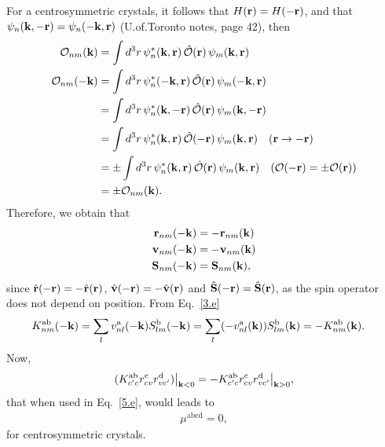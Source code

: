 \documentclass[floatfix,prb,aps,superscriptaddress,11pt]{revtex4}
\begin{document}
For a centrosymmetric crystals, it follows that $H(\mathbf{r})=H(-\mathbf{r})$,
and that $\psi_n(\mathbf{k},-\mathbf{r})=\psi_n(-\mathbf{k},\mathbf{r})$
 (U.of.Toronto notes,
page 42), then 
\begin{align}\label{e.0}
{\cal O}_{nm}(\mathbf{k}) 
&=\int d^3r\, \psi^*_n(\mathbf{k},\mathbf{r})\, \hat{{\cal O}}(\mathbf{r})\,\psi_m(\mathbf{k},\mathbf{r}) 
\nonumber\\
{\cal O}_{nm}(-\mathbf{k}) 
&=\int d^3r\, \psi^*_n(-\mathbf{k},\mathbf{r})\, \hat{{\cal O}}(\mathbf{r})\,\psi_m(-\mathbf{k},\mathbf{r}) 
\nonumber\\
&=\int d^3r\, \psi^*_n(\mathbf{k},-\mathbf{r})\, \hat{{\cal O}}(\mathbf{r})\,\psi_m(\mathbf{k},-\mathbf{r}) 
\nonumber\\
&=\int d^3r\, \psi^*_n(\mathbf{k},\mathbf{r})\,
  \hat{{\cal O}}(-\mathbf{r})\,\psi_m(\mathbf{k},\mathbf{r})\quad(\mathbf{r}\to-\mathbf{r})  
\nonumber\\
&=\pm\int d^3r\, \psi^*_n(\mathbf{k},\mathbf{r})\,
  \hat{{\cal O}}(\mathbf{r})\,\psi_m(\mathbf{k},\mathbf{r})\quad({\cal O}(-\mathbf{r})=\pm {\cal O}(\mathbf{r}))  
\nonumber\\
&=\pm{\cal O}_{nm}(\mathbf{k})
.
\end{align}
Therefore, we obtain that
\begin{align}\label{e.1}
\mathbf{r}_{nm}(-\mathbf{k})&=-\mathbf{r}_{nm}(\mathbf{k}) 
\nonumber\\
\mathbf{v}_{nm}(-\mathbf{k})&=-\mathbf{v}_{nm}(\mathbf{k}) 
\nonumber\\
\mathbf{S}_{nm}(-\mathbf{k})&=\mathbf{S}_{nm}(\mathbf{k}) 
,
\end{align}
since 
$\hat{\mathbf{r}}(-\mathbf{r})=-\hat{\mathbf{r}}(\mathbf{r})$,  
$\hat{\mathbf{v}}(-\mathbf{r})=-\hat{\mathbf{v}}(\mathbf{r})$  
and
$\hat{\mathbf{S}}(-\mathbf{r})=\hat{\mathbf{S}}(\mathbf{r})$, as the spin operator does not depend
on position. From Eq.~\eqref{3.e}
\begin{align}\label{e.2}
K^{\mathrm{a}\mathrm{b}}_{nm}(-\mathbf{k}) 
&=\sum_l v^{\mathrm{a}}_{nl}(-\mathbf{k}) S^{\mathrm{b}} _{lm} (-\mathbf{k}) 
=\sum_l (-v^{\mathrm{a}}_{nl}(\mathbf{k})) S^{\mathrm{b}} _{lm} (\mathbf{k})
=-K^{\mathrm{a}\mathrm{b}}_{nm}(\mathbf{k}) 
.
\end{align}
Now, 
\begin{align}\label{e.3}
(K^{\mathrm{a}\mathrm{b}}_{c'c}
r^{\mathrm{c}}_{cv}r^{\mathrm{d}}_{vc'}) \big |_{\mathbf{k}<0}
=
-K^{\mathrm{a}\mathrm{b}}_{c'c}
r^{\mathrm{c}}_{cv}r^{\mathrm{d}}_{vc'} \big |_{\mathbf{k}>0}
,
\end{align}
that when used in Eq.~\eqref{5.e}, would leads to
\begin{align}\label{e.4}
\mu^{\mathrm{abcd}}=0
,
\end{align}
for centrosymmetric crystals.
 
\end{document}
